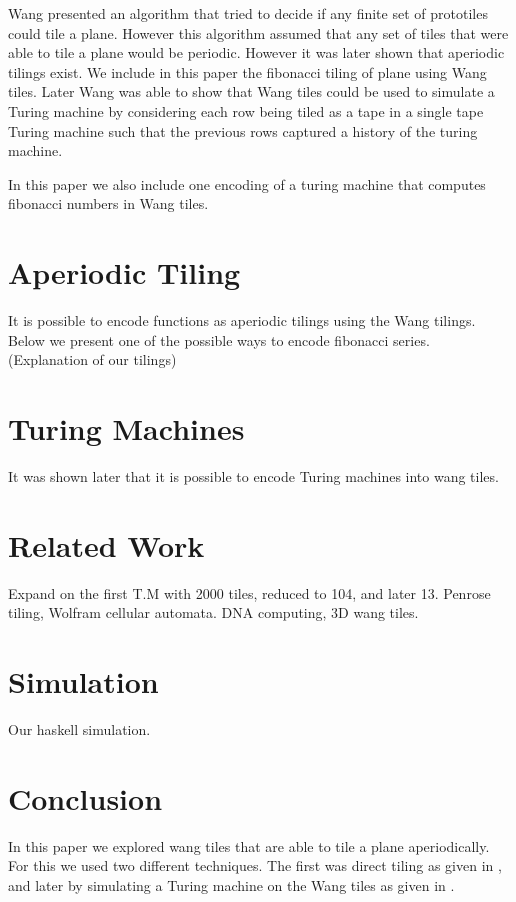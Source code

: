\documentclass{article}
\begin{document}
Wang presented an algorithm that tried to decide if any finite set of prototiles could tile a plane. However this algorithm assumed that any set of tiles that were able to tile a plane would be periodic. However it was later shown that aperiodic tilings exist. We include in this paper the fibonacci tiling of plane using Wang tiles. Later Wang was able to show that Wang tiles could be used to simulate a Turing machine by considering each row being tiled as a tape in a single tape Turing machine such that the previous rows captured a history of the turing machine.

In this paper we also include one encoding of a turing machine that computes fibonacci numbers in Wang tiles.

\section*{Aperiodic Tiling}
It is possible to encode functions as aperiodic tilings using the Wang tilings. Below we present one of the possible ways to encode fibonacci series. (Explanation of our tilings)

\section*{Turing Machines}
It was shown later that it is possible to encode Turing machines into wang tiles.

\section*{Related Work}
Expand on the first T.M with 2000 tiles, reduced to 104, and later 13. Penrose tiling, Wolfram cellular automata. DNA computing, 3D wang tiles.

\section*{Simulation}
Our haskell simulation.

\section*{Conclusion}
In this paper we explored wang tiles that are able to tile a plane aperiodically. For this we used two different techniques. The first was direct tiling as given in \cite{tilings}, and later by simulating a Turing machine on the Wang tiles as given in \cite{tmtiles}.

\end{document}

